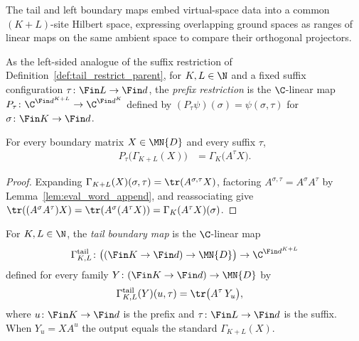 The tail and left boundary maps embed virtual-space data into a common
$(K+L)$-site Hilbert space, expressing overlapping ground spaces as ranges of
linear maps on the same ambient space to compare their orthogonal projectors.

\begin{definition}\label{def:prefix_restrict}
    \leanok
    As the left-sided analogue of the suffix restriction of
    Definition~\ref{def:tail_restrict_parent}, for $K,L\in\N$ and a fixed
    suffix configuration $\tau\colon\Fin L\to\Fin d$, the
    \emph{prefix restriction} is the $\C$-linear map
    $P_\tau\colon\C^{\Fin d^{K+L}}\to\C^{\Fin d^K}$ defined by
    $(P_\tau\psi)(\sigma)=\psi(\sigma,\tau)$ for $\sigma\colon\Fin K\to\Fin d$.
\end{definition}

\begin{lemma}\label{lem:prefix_restrict_ground_space_map}
    \leanok
    For every boundary matrix $X\in\MN{D}$ and every suffix $\tau$,
    \begin{align}
        P_\tau\bigl(\Gamma_{K+L}(X)\bigr)
         & =\Gamma_K\bigl(A^\tau X\bigr).
    \end{align}
\end{lemma}

\begin{proof}
    \leanok
    Expanding $\Gamma_{K+L}(X)(\sigma,\tau)=\tr(A^{\sigma,\tau}X)$,
    factoring $A^{\sigma,\tau}=A^\sigma A^\tau$ by
    Lemma~\ref{lem:eval_word_append}, and reassociating give
    $\tr((A^\sigma A^\tau)X)=\tr(A^\sigma(A^\tau X))
        =\Gamma_K(A^\tau X)(\sigma)$.
\end{proof}

\begin{definition}\label{def:tail_boundary_map}
    \leanok
    For $K,L\in\N$, the \emph{tail boundary map} is the $\C$-linear map
    \begin{align}
        \Gamma^{\mathrm{tail}}_{K,L}\colon
        \bigl((\Fin K\to\Fin d)\to\MN{D}\bigr)
        \to\C^{\Fin d^{K+L}}
    \end{align}
    defined for every family $Y\colon(\Fin K\to\Fin d)\to\MN{D}$ by
    \begin{align}
        \Gamma^{\mathrm{tail}}_{K,L}(Y)(u,\tau)
         & =\tr\bigl(A^\tau\,Y_u\bigr),
    \end{align}
    where $u\colon\Fin K\to\Fin d$ is the prefix and
    $\tau\colon\Fin L\to\Fin d$ is the suffix.
    When $Y_u=X A^u$ the output equals the standard $\Gamma_{K+L}(X)$.
\end{definition}

